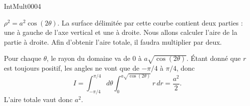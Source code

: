 
\begin{corrige}{IntMult0004}

	$\rho^2=a^2\cos(2\theta)$. La surface délimitée par cette courbe contient deux parties : une à gauche de l'axe vertical et une à droite. Nous allons calculer l'aire de la partie à droite. Afin d'obtenir l'aire totale, il faudra multiplier par deux.
	
	Pour chaque $\theta$, le rayon du domaine va de $0$ à $a\sqrt{\cos(2\theta)}$. Étant donné que $r$ est toujours positif, les angles ne vont que de $-\pi/4$ à $\pi/4$, donc
\begin{equation}
	I=\int_{-\pi/4}^{\pi/4}d\theta\int_0^{a\sqrt{\cos(2\theta)}}r\,dr=\frac{ a^2 }{ 2 }.
\end{equation}
	L'aire totale vaut donc $a^2$.

\end{corrige}
